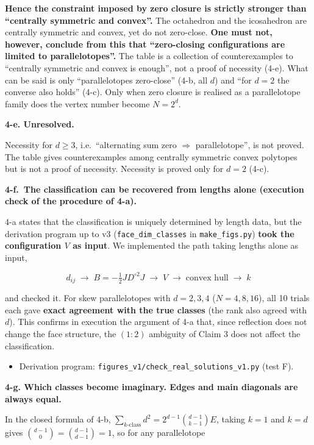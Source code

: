 \documentclass[
  10pt,
]{article}
\providecommand{\tightlist}{%
  \setlength{\itemsep}{0pt}\setlength{\parskip}{0pt}}
\begin{document}
\textbf{Hence the constraint imposed by zero closure is strictly
stronger than ``centrally symmetric and convex''.} The octahedron and
the icosahedron are centrally symmetric and convex, yet do not
zero-close. \textbf{One must not, however, conclude from this that
``zero-closing configurations are limited to parallelotopes''.} The
table is a collection of counterexamples to ``centrally symmetric and
convex is enough'', not a proof of necessity (4-e). What can be said is
only ``parallelotopes zero-close'' (4-b, all \(d\)) and ``for \(d=2\)
the converse also holds'' (4-c). Only when zero closure is realised as a
parallelotope family does the vertex number become \(N=2^d\).

\textbf{4-e. Unresolved.}

Necessity for \(d \ge 3\), i.e.~``alternating sum zero \(\Rightarrow\)
parallelotope'', is not proved. The table gives counterexamples among
centrally symmetric convex polytopes but is not a proof of necessity.
Necessity is proved only for \(d=2\) (4-c).

\textbf{4-f.~The classification can be recovered from lengths alone
(execution check of the procedure of 4-a).}

4-a states that the classification is uniquely determined by length
data, but the derivation program up to v3 (\texttt{face\_dim\_classes}
in \texttt{make\_figs.py}) \textbf{took the configuration \(V\) as
input}. We implemented the path taking lengths alone as input,

\[d_{ij} \;\longrightarrow\; B = -\tfrac12 JD^{\circ2}J \;\longrightarrow\; V \;\longrightarrow\; \text{convex hull} \;\longrightarrow\; k\]

and checked it. For skew parallelotopes with \(d = 2, 3, 4\)
(\(N = 4, 8, 16\)), all 10 trials each gave \textbf{exact agreement with
the true classes} (the rank also agreed with \(d\)). This confirms in
execution the argument of 4-a that, since reflection does not change the
face structure, the \((1{:}2)\) ambiguity of Claim 3 does not affect the
classification.

\begin{itemize}
\tightlist
\item
  Derivation program: \texttt{figures\_v1/check\_real\_solutions\_v1.py}
  (test F).
\end{itemize}

\textbf{4-g. Which classes become imaginary. Edges and main diagonals
are always equal.}

In the closed formula of 4-b,
\(\sum_{k\text{-class}}d^2 = 2^{d-1}\binom{d-1}{k-1}E\), taking \(k=1\)
and \(k=d\) gives \(\binom{d-1}{0} = \binom{d-1}{d-1} = 1\), so for any
parallelotope
\end{document}
